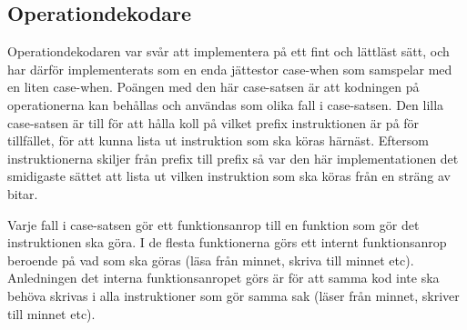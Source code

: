 \documentclass[main.tex]{subfiles}
\begin{document}
\subsection{Operationdekodare}
Operationdekodaren var svår att implementera på ett fint och lättläst sätt,
och har därför implementerats som en enda jättestor case-when som samspelar med
en liten case-when. Poängen med den här case-satsen är att kodningen på
operationerna kan behållas och användas som olika fall i case-satsen. Den lilla
case-satsen är till för att hålla koll på vilket prefix instruktionen är på för
tillfället, för att kunna lista ut instruktion som ska köras härnäst. Eftersom
instruktionerna skiljer från prefix till prefix så var den här implementationen
det smidigaste sättet att lista ut vilken instruktion som ska köras från en
sträng av bitar.

Varje fall i case-satsen gör ett funktionsanrop till en funktion som gör det
instruktionen ska göra. I de flesta funktionerna görs ett internt
funktionsanrop beroende på vad som ska göras (läsa från minnet, skriva till
minnet etc). Anledningen det interna funktionsanropet görs är för att samma kod
inte ska behöva skrivas i alla instruktioner som gör samma sak (läser från minnet,
skriver till minnet etc).
\end{document}
